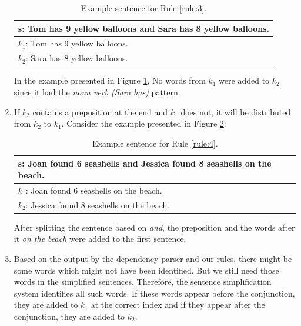 \documentclass[11pt]{article}
\begin{document}
\begin{enumerate}
\begin{table}[h!]
\centering
\begin{tabular}{ | m{25em} | }
\hline
 $\mathbf{s}$\textbf{: Tom has 9 yellow balloons and Sara has 8 yellow balloons.}\\
\hline
$\mathit{k_{1}}$: Tom has 9 yellow balloons.\\
\hline
$\mathit{k_{2}}$: Sara has 8 yellow balloons.\\
\hline
\end{tabular}
\caption{Example sentence for Rule  \ref{rule:3}.}
\label{figure:11}
\end{table}

In the example presented in Figure \ref{figure:11}, No words from $\mathit{k_{1}}$ were added to $\mathit{k_{2}}$ since it had the \textit{noun verb (Sara has)} pattern.

\item \label{rule:4}
If $\mathit{k_{2}}$ contains a preposition at the end and $\mathit{k_{1}}$ does not, it will be distributed from $\mathit{k_{2}}$ to $\mathit{k_{1}}$. Consider the example presented in Figure \ref{figure:12}:

\newpage
\begin{table}[h!]
\centering
\begin{tabular}{ | m{25em} | }
\hline
 $\mathbf{s}$\textbf{: Joan found 6 seashells and Jessica found 8 seashells on the beach.}\\
\hline
$\mathit{k_{1}}$: Joan found 6 seashells on the beach.\\
\hline
$\mathit{k_{2}}$: Jessica found 8 seashells on the beach.\\
\hline
\end{tabular}
\caption{Example sentence for Rule  \ref{rule:4}.}
\label{figure:12}
\end{table}

After splitting the sentence based on \textit{and}, the preposition and the words after it \textit{on the beach} were added to the first sentence.

\item
Based on the output by the dependency parser and our rules, there might be some words which might not have been identified. But we still need those words in the simplified sentences. Therefore, the sentence simplification system identifies all such words. If these words appear before the conjunction, they are added to $\mathit{k_{1}}$ at the correct index and if they appear after the conjunction, they are added to $\mathit{k_{2}}$.

\end{enumerate}
\end{document}
